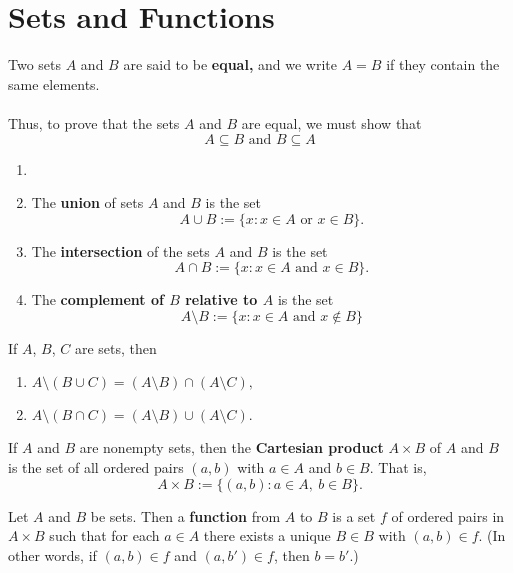 \section{Sets and Functions}

\begin{definition}
	Two sets $A$ and $B$ are said to be \textbf{equal,} and we write $A=B$ if they contain the same elements.
	\\\\Thus, to prove that the sets $A$ and $B$ are equal, we must show that
	\[A \subseteq B \text{ and } B \subseteq A\]
\end{definition}

\begin{definition}
	\begin{enumerate}
		\item[]
		\item The \textbf{union} of sets $A$ and $B$ is the set
		      \[A \cup B := \{x:x \in A \text{ or } x \in B\}.\]

		\item The \textbf{intersection} of the sets $A$ and $B$ is the set
		      \[A \cap B := \{x:x \in A \text{ and } x \in B \}.\]

		\item The \textbf{complement of $B$ relative to $A$} is the set
		      \[A \setminus B := \{x:x \in A \text{ and } x \notin B\}\]
	\end{enumerate}
\end{definition}

\begin{theorem}
	If $A$, $B$, $C$ are sets, then
	\begin{enumerate}
		\item $A \setminus (B \cup C) = (A \setminus B) \cap (A \setminus C),$
		\item $A \setminus (B \cap C) = (A \setminus B) \cup (A \setminus C).$
	\end{enumerate}
\end{theorem}

\begin{definition}
	If $A$ and $B$ are nonempty sets, then the \textbf{Cartesian product} $A \times B$ of $A$ and $B$ is the set of all ordered pairs $(a,b)$ with $a \in A$ and $b \in B$. That is,
	\[A \times B := \{(a,b): a \in A,\ b \in B\}.\]
\end{definition}

\begin{definition}
	Let $A$ and $B$ be sets. Then a \textbf{function} from $A$ to $B$ is a set $f$ of ordered pairs in $A \times B$ such that for each $a \in A$ there exists a unique $B \in B$ with $(a,b) \in f$. (In other words, if $(a,b) \in f$ and $(a, b') \in f$, then $b = b'$.)
\end{definition}


